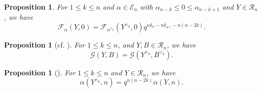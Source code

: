 \documentclass[11pt,oneside]{amsart}
\theoremstyle{plain}
\newtheorem{proposition}[theorem]{Proposition}
\theoremstyle{definition}
\theoremstyle{remark}
\newcommand{\CE}{{\mathcal E}}
\newcommand{\CF}{{\mathcal F}}
\newcommand{\CG}{{\mathcal G}}
\newcommand{\CR}{{\mathcal R}}
\numberwithin{equation}{section}
\begin{document}
	
	\begin{proposition}\label{proposition2.22}
		For $1 \leq k \leq n$ and $\alpha \in \CE_n$ with $\alpha_{n-k} \leq 0 \leq \alpha_{n-k+1}$ and $Y \in \CR_n$, we have
		\begin{equation*}
			\CF_{\alpha}(Y,0)=\CF_{\alpha^{\vee_k}}(Y^{\wedge_k},0)q^{n\delta_{\alpha}-n\delta_{\alpha^{\vee_k}}-n(n-2k)}.
		\end{equation*}
	\end{proposition}
	
	\begin{proposition}[cf. {\cite[Lemma 3.8]{Cho}}]\label{proposition2.23} For $1 \leq k \leq n$, and $Y,B \in \CR_n$, we have
		\begin{equation*}
			\CG(Y,B)=\CG(Y^{\wedge_k},B^{\vee_k}).
		\end{equation*}
		
	\end{proposition}
	
	\begin{proposition}[{\cite[Lemma 3.9]{Cho}}]\label{proposition2.24} For $1 \leq k \leq n$ and $Y \in \CR_n$, we have
		\begin{equation*}
			\alpha(Y^{\wedge_k},n)=q^{n(n-2k)}\alpha(Y,n).
		\end{equation*}
	\end{proposition}
	
\end{document}
